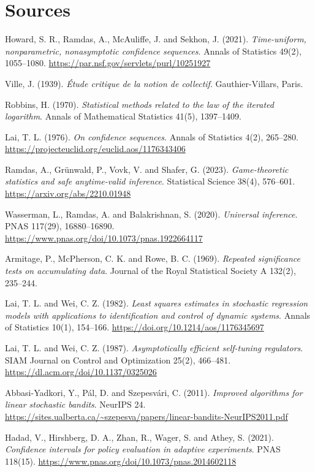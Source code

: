 \section*{Sources}
\begingroup\raggedright
\begin{enumerate}[label={[\arabic*]},leftmargin=2.5em]
\item Howard, S. R., Ramdas, A., McAuliffe, J. and Sekhon, J. (2021). \emph{Time-uniform, nonparametric, nonasymptotic confidence sequences}. Annals of Statistics 49(2), 1055--1080. \url{https://par.nsf.gov/servlets/purl/10251927}
\item Ville, J. (1939). \emph{\'Etude critique de la notion de collectif}. Gauthier-Villars, Paris.
\item Robbins, H. (1970). \emph{Statistical methods related to the law of the iterated logarithm}. Annals of Mathematical Statistics 41(5), 1397--1409.
\item Lai, T. L. (1976). \emph{On confidence sequences}. Annals of Statistics 4(2), 265--280. \url{https://projecteuclid.org/euclid.aos/1176343406}
\item Ramdas, A., Gr\"unwald, P., Vovk, V. and Shafer, G. (2023). \emph{Game-theoretic statistics and safe anytime-valid inference}. Statistical Science 38(4), 576--601. \url{https://arxiv.org/abs/2210.01948}
\item Wasserman, L., Ramdas, A. and Balakrishnan, S. (2020). \emph{Universal inference}. PNAS 117(29), 16880--16890. \url{https://www.pnas.org/doi/10.1073/pnas.1922664117}
\item Armitage, P., McPherson, C. K. and Rowe, B. C. (1969). \emph{Repeated significance tests on accumulating data}. Journal of the Royal Statistical Society A 132(2), 235--244.
\item Lai, T. L. and Wei, C. Z. (1982). \emph{Least squares estimates in stochastic regression models with applications to identification and control of dynamic systems}. Annals of Statistics 10(1), 154--166. \url{https://doi.org/10.1214/aos/1176345697}
\item Lai, T. L. and Wei, C. Z. (1987). \emph{Asymptotically efficient self-tuning regulators}. SIAM Journal on Control and Optimization 25(2), 466--481. \url{https://dl.acm.org/doi/10.1137/0325026}
\item Abbasi-Yadkori, Y., P\'al, D. and Szepesv\'ari, C. (2011). \emph{Improved algorithms for linear stochastic bandits}. NeurIPS 24. \url{https://sites.ualberta.ca/~szepesva/papers/linear-bandits-NeurIPS2011.pdf}
\item Hadad, V., Hirshberg, D. A., Zhan, R., Wager, S. and Athey, S. (2021). \emph{Confidence intervals for policy evaluation in adaptive experiments}. PNAS 118(15). \url{https://www.pnas.org/doi/10.1073/pnas.2014602118}

\end{enumerate}
